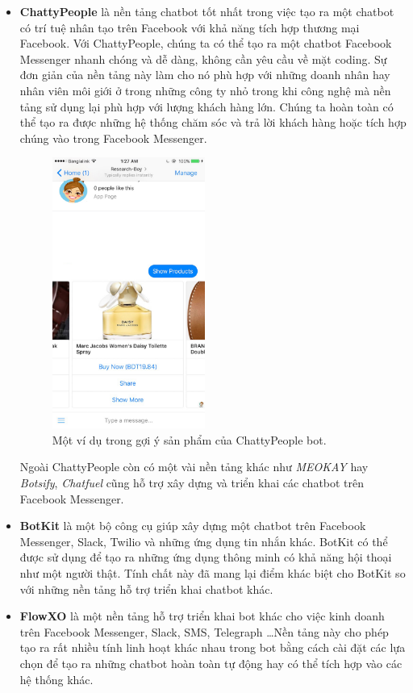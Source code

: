 \documentclass[12pt]{report}
\begin{document}
\begin{itemize}
	\item \textbf{ChattyPeople} là nền tảng chatbot tốt nhất trong việc tạo ra một chatbot có trí tuệ nhân tạo trên Facebook với khả năng tích hợp thương mại Facebook. Với ChattyPeople, chúng ta có thể tạo ra một chatbot Facebook Messenger nhanh chóng và dễ dàng, không cần yêu cầu về mặt coding. Sự đơn giản của nền tảng này làm cho nó phù hợp với những doanh nhân hay nhân viên môi giới ở trong những công ty nhỏ trong khi công nghệ mà nền tảng sử dụng lại phù hợp với lượng khách hàng lớn. Chúng ta hoàn toàn có thể tạo ra được những hệ thống chăm sóc và trả lời khách hàng hoặc tích hợp chúng vào trong Facebook Messenger.

	\begin{figure}[H]
	  \centering
	    \includegraphics[width=5cm]{Pics/Chap2/chatty-prople.jpg}
	  \caption{Một ví dụ trong gợi ý sản phẩm của ChattyPeople bot.}
	\end{figure}

Ngoài ChattyPeople còn có một vài nền tảng khác như \textit{MEOKAY} hay \textit{Botsify}, \textit{Chatfuel} cũng hỗ trợ xây dựng và triển khai các chatbot trên Facebook Messenger.

	\item \textbf{BotKit} là một bộ công cụ giúp xây dựng một chatbot trên Facebook Messenger, Slack, Twilio và những ứng dụng tin nhắn khác. BotKit có thể được sử dụng để tạo ra những ứng dụng thông minh có khả năng hội thoại như một người thật. Tính chất này đã mang lại điểm khác biệt cho BotKit so với những nền tảng hỗ trợ triển khai chatbot khác.

	\item \textbf{FlowXO} là một nền tảng hỗ trợ triển khai bot khác cho việc kinh doanh trên Facebook Messenger, Slack, SMS, Telegraph \ldots Nền tảng này cho phép tạo ra rất nhiều tính linh hoạt khác nhau trong bot bằng cách cài đặt các lựa chọn để tạo ra những chatbot hoàn toàn tự động hay có thể tích hợp vào các hệ thống khác.
\end{itemize}
\end{document}
